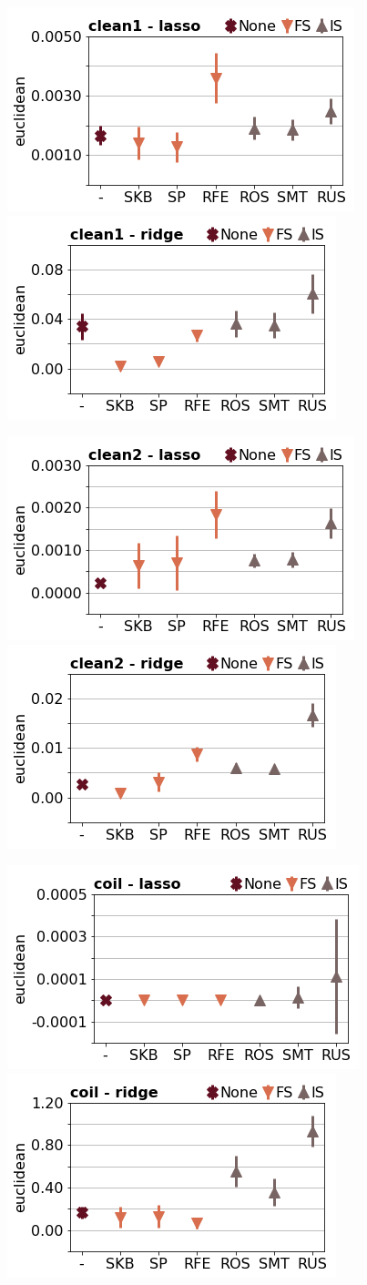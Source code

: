 \documentclass[runningheads,a4paper]{llncs}
\begin{document}
\begin{figure}[!h]

\includegraphics[width=0.32\linewidth]{fig/preps_clean1_LM_lasso_euclidean.png}
\includegraphics[width=0.32\linewidth]{fig/preps_clean1_LM_ridge_euclidean.png}
\end{figure}


\begin{figure}[!h]
\includegraphics[width=0.32\linewidth]{fig/preps_clean2_LM_lasso_euclidean.png}
\includegraphics[width=0.32\linewidth]{fig/preps_clean2_LM_ridge_euclidean.png}
\end{figure}


\begin{figure}[!h]
\includegraphics[width=0.32\linewidth]{fig/preps_coil2000_LM_lasso_euclidean.png}
\includegraphics[width=0.32\linewidth]{fig/preps_coil2000_LM_ridge_euclidean.png}
\end{figure}
\end{document}
